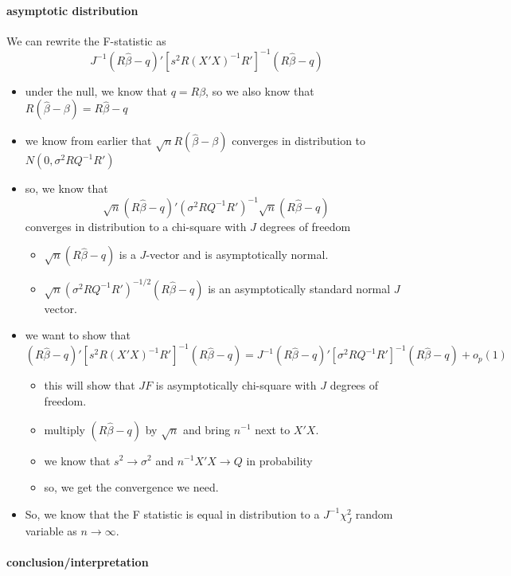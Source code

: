 \paragraph{asymptotic distribution}
\label{sec-3-1-2-2}

       We can rewrite the F-statistic as
       \[ J^{-1} (R\hat\beta - q)'[s^2 R(X'X)^{-1}R']^{-1}(R\hat\beta -
       q) \]
\begin{itemize}
\item under the null, we know that $q = R\beta$, so we also know
         that $R(\hat\beta - \beta) = R\hat\beta - q$
\item we know from earlier that $\sqrt{n} R(\hat\beta - \beta)$
         converges in distribution to $N(0, \sigma^2 R Q^{-1} R')$
\item so, we know that \[\sqrt{n} (R\hat\beta - q)' (\sigma^2 R
         Q^{-1} R')^{-1} \sqrt{n} (R\hat\beta - q) \] converges in
         distribution to a chi-square with $J$ degrees of freedom
\begin{itemize}
\item $\sqrt{n}(R\hat\beta - q)$ is a $J$-vector and is asymptotically
           normal.
\item $\sqrt{n}(\sigma^2 R Q^{-1} R')^{-1/2} (R\hat\beta - q)$ is
           an asymptotically standard normal $J$ vector.
\end{itemize}
\item we want to show that \[ (R\hat\beta - q)'[s^2
         R(X'X)^{-1}R']^{-1}(R\hat\beta - q) = J^{-1} (R\hat\beta -
         q)'[\sigma^2 RQ^{-1}R']^{-1}(R\hat\beta - q) + o_p(1)\]
\begin{itemize}
\item this will show that $J F$ is asymptotically chi-square with
           $J$ degrees of freedom.
\item multiply $(R\hat\beta - q)$ by $\sqrt{n}$ and bring $n^{-1}$
           next to $X'X$.
\item we know that $s^2 \to \sigma^2$ and $n^{-1} X'X \to Q$ in probability
\item so, we get the convergence we need.
\end{itemize}
\item So, we know that the F statistic is equal in distribution
         to a $J^{-1} \chi_J^2$ random variable as $n \to \infty$.
\end{itemize}
\paragraph{conclusion/interpretation}
\label{sec-3-1-2-3}
